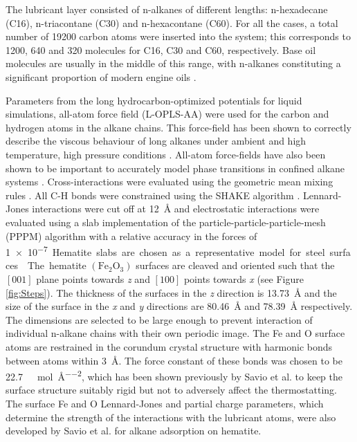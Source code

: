 \documentclass[aps,prb,reprint,superscriptaddress, a4paper]{revtex4-1}
\begin{document}
The lubricant layer consisted of n-alkanes of different lengths: n-hexadecane (C16), n-triacontane (C30) and n-hexacontane (C60). For all the cases, a  total number of 19200 carbon atoms were inserted into the system; this corresponds to 1200, 640 and 320 molecules for C16, C30 and C60, respectively. Base oil molecules are usually in the middle of this range, with n-alkanes constituting a significant proportion of modern engine oils \cite{Liang2018}.

Parameters from the long hydrocarbon-optimized potentials for liquid simulations, all-atom force field (L-OPLS-AA)\cite{Jorgensen1996,Siu2012} were used for the carbon and hydrogen atoms in the alkane chains. This force-field has been shown to correctly describe the viscous behaviour of long alkanes under ambient and high temperature, high pressure conditions \cite{Ewen2016a}. All-atom force-fields have also been shown to be important to accurately model phase transitions in confined alkane systems \cite{Docherty2010}. Cross-interactions were evaluated using the geometric mean mixing rules \cite{Jorgensen1996}. All C-H bonds were constrained using the SHAKE algorithm \cite{Ryckaert1977}. Lennard-Jones interactions were cut off at \SI{12}{\angstrom} and electrostatic interactions were evaluated using a slab implementation of the particle-particle-particle-mesh (PPPM) algorithm \cite{Yeh1999} with a relative accuracy in the forces of \SI{1e-7}.

Hematite slabs are chosen as a representative model for steel surfaces \cite{Oh1998}. The hematite $\left(\text{Fe}_2\text{O}_3\right)$ surfaces \cite{Maslen1994} are cleaved and oriented such that the $\left[001\right]$ plane points towards \emph{z} and $\left[100\right]$ points towards \emph{x} (see Figure \ref{fig:Steps}). The thickness of the surfaces in the \emph{z} direction is \SI{13.73}{\angstrom} and the size of the surface in the \emph{x} and \emph{y} directions are \SI{80.46}{\angstrom} and \SI{78.39}{\angstrom} respectively. The dimensions are selected to be large enough to prevent interaction of individual n-alkane chains with their own periodic image. The Fe and O surface atoms are restrained in the corundum crystal structure with harmonic bonds between atoms within \SI{3}{\angstrom}. The force constant of these bonds was chosen to be \SI{22.7}{\kilo\calorie\per\mol\per\angstrom\squared}, which has been shown previously by Savio et al.\cite{Savio2012} to keep the surface structure suitably rigid but not to adversely affect the thermostatting\cite{Savio2012}. The surface Fe and O Lennard-Jones and partial charge parameters, which determine the strength of the interactions with the lubricant atoms, were also developed by Savio et al. for alkane adsorption on hematite\cite{Savio2012}.
\end{document}
